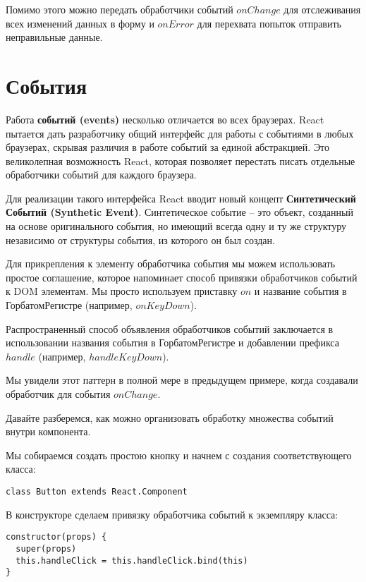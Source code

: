 Помимо этого можно передать обработчики событий $onChange$ для отслеживания всех изменений данных в форму и $onError$ для перехвата попыток отправить неправильные данные.

\section{События}

Работа \textbf{событий (events)} несколько отличается во всех браузерах. React пытается дать разработчику общий интерфейс для работы с событиями в любых браузерах, скрывая различия в работе событий за единой абстракцией. Это великолепная возможность React, которая позволяет перестать писать отдельные обработчики событий для каждого браузера.

Для реализации такого интерфейса React вводит новый концепт \textbf{Синтетический Событий (Synthetic Event)}. Синтетическое событие -- это объект, созданный на основе оригинального события, но имеющий всегда одну и ту же структуру независимо от структуры события, из которого он был создан.

Для прикрепления к элементу обработчика события мы можем использовать простое соглашение, которое напоминает способ привязки обработчиков событий к DOM элементам. Мы просто используем приставку $on$ и название события в ГорбатомРегистре (например, $onKeyDown$). 

Распространенный способ объявления обработчиков событий заключается в использовании названия события в ГорбатомРегистре и добавлении префикса $handle$ (например, $handleKeyDown$).

Мы увидели этот паттерн в полной мере в предыдущем примере, когда создавали обработчик для события $onChange$.

Давайте разберемся, как можно организовать обработку множества событий внутри компонента.

Мы собираемся создать простою кнопку и начнем с создания соответствующего класса:

\begin{lstlisting}
class Button extends React.Component
\end{lstlisting}

В конструкторе сделаем привязку обработчика событий к экземпляру класса:

\begin{lstlisting}
constructor(props) {
  super(props)
  this.handleClick = this.handleClick.bind(this)
}
\end{lstlisting}

